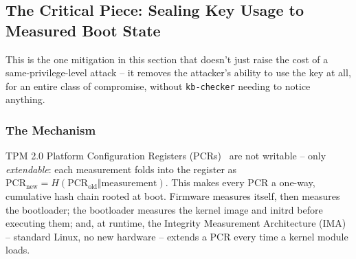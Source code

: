\documentclass[11pt,a4paper]{article}
\begin{document}
\FloatBarrier

\subsection{The Critical Piece: Sealing Key Usage to Measured Boot State}
\label{sec:pcr-seal}

This is the one mitigation in this section that doesn't just raise the
cost of a same-privilege-level attack -- it removes the attacker's
ability to use the key at all, for an entire class of compromise,
without \texttt{kb-checker} needing to notice anything.

\subsubsection{The Mechanism}

TPM 2.0 Platform Configuration Registers (PCRs)~\cite{tcgtpm2,tcgpcclient}
are not writable -- only \emph{extendable}: each measurement folds into
the register as $\mathrm{PCR}_{\text{new}} = H(\mathrm{PCR}_{\text{old}}
\Vert \text{measurement})$. This makes every PCR a one-way, cumulative
hash chain rooted at boot. Firmware measures itself, then measures the
bootloader; the bootloader measures the kernel image and initrd before
executing them; and, at runtime, the Integrity Measurement
Architecture (IMA)~\cite{sailer2004,kernelima} -- standard Linux, no
new hardware -- extends a PCR every time a kernel module loads.
\end{document}
